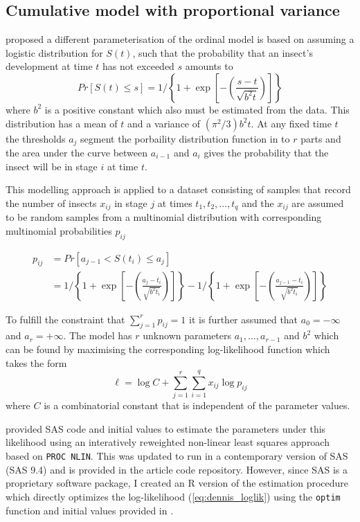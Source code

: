 \subsection{Cumulative model with proportional variance}
\citet{dennis1986stochastic} proposed a different parameterisation of the ordinal model is based on assuming a logistic distribution for $S(t)$, such that the probability that an insect's development at time $t$ has not exceeded $s$ amounts to 
\begin{equation}
Pr[S(t) \leq s] = 1 \bigg/ \left\{ 1 + \exp\left[-\left(\frac{s-t}{\sqrt{b^2t}}\right)\right]\right\}
\end{equation}
where $b^2$ is a positive constant which also must be estimated from the data. 
This distribution has a mean of $t$ and a variance of $(\pi^2/3)b^2t$.
At any fixed time $t$ the thresholds $a_j$ segment the porbaility distribution function in to $r$ parts and the area under the curve between $a_{i-1}$ and $a_i$ gives the probability that the insect will be in stage $i$ at time $t$.

This modelling approach is applied to a dataset consisting of samples that record the number of insects $x_{ij}$ in stage $j$ at times $t_1, t_2, \dots, t_q$ and the $x_{ij}$ are assumed to be random samples from a multinomial distribution with corresponding multinomial probabilities $p_{ij}$

\begin{align}
p_{ij} & = Pr[a_{j-1} < S(t_i) \leq a_{j}]\\
& = 1 \bigg/ \left\{ 1 + \exp\left[-\left(\frac{a_j-t_i}{\sqrt{b^2t_i}}\right)\right]\right\} - 1 \bigg/ \left\{ 1 + \exp\left[-\left(\frac{a_{j-1}-t_i}{\sqrt{b^2t_i}}\right)\right]\right\}\label{eq:dennis_cm}
\end{align}

To fulfill the constraint that $\sum_{j=1}^r p_{ij}= 1$ it is further assumed that $a_0 = -\infty$ and $a_r = +\infty$.
The model has $r$ unknown parameters $a_1, \dots, a_{r-1}$ and $b^2$ which can be found by maximising the corresponding log-likelihood function which takes the form 
\begin{equation}
\mathcal{\ell} = \log C + \sum_{j=1}^r \sum_{i=1}^q x_{ij} \log p_{ij}
\label{eq:dennis_loglik}
\end{equation}
where $C$ is a combinatorial constant that is independent of the parameter values.

\citet{dennis1986stochastic} provided SAS code and initial values to estimate the parameters under this likelihood using an interatively reweighted non-linear least squares approach based on \verb+PROC NLIN+. 
This was updated to run in a contemporary version of SAS (SAS 9.4) and is provided in the article code repository. 
However, since SAS is a proprietary software package, I created an R version of the estimation procedure which directly optimizes the log-likelihood (\ref{eq:dennis_loglik}) using the \verb+optim+ function and initial values provided in \citep{dennis1986stochastic}.

